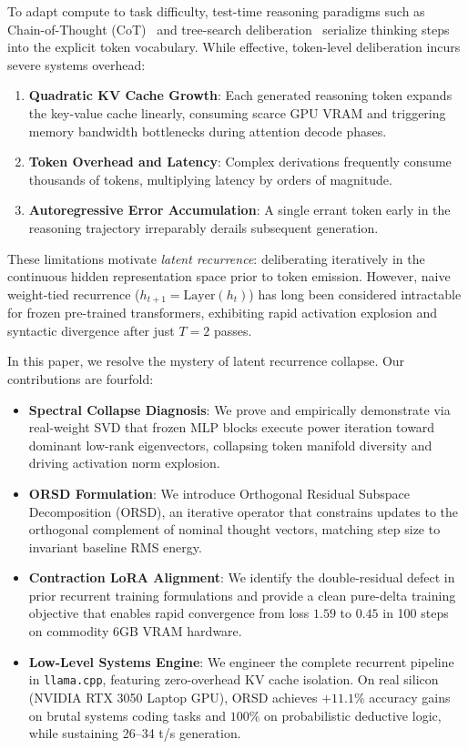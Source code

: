 \documentclass[11pt,a4paper]{article}
\theoremstyle{plain}
\theoremstyle{definition}
\theoremstyle{remark}
\begin{document}
To adapt compute to task difficulty, test-time reasoning paradigms such as Chain-of-Thought (CoT)~\cite{wei2022chain} and tree-search deliberation~\cite{yao2023tree} serialize thinking steps into the explicit token vocabulary. While effective, token-level deliberation incurs severe systems overhead:
\begin{enumerate}
    \item \textbf{Quadratic KV Cache Growth}: Each generated reasoning token expands the key-value cache linearly, consuming scarce GPU VRAM and triggering memory bandwidth bottlenecks during attention decode phases.
    \item \textbf{Token Overhead and Latency}: Complex derivations frequently consume thousands of tokens, multiplying latency by orders of magnitude.
    \item \textbf{Autoregressive Error Accumulation}: A single errant token early in the reasoning trajectory irreparably derails subsequent generation.
\end{enumerate}

These limitations motivate \textit{latent recurrence}: deliberating iteratively in the continuous hidden representation space prior to token emission. However, naive weight-tied recurrence ($h_{t+1} = \text{Layer}(h_t)$) has long been considered intractable for frozen pre-trained transformers, exhibiting rapid activation explosion and syntactic divergence after just $T=2$ passes.

In this paper, we resolve the mystery of latent recurrence collapse. Our contributions are fourfold:
\begin{itemize}
    \item \textbf{Spectral Collapse Diagnosis}: We prove and empirically demonstrate via real-weight SVD that frozen MLP blocks execute power iteration toward dominant low-rank eigenvectors, collapsing token manifold diversity and driving activation norm explosion.
    \item \textbf{ORSD Formulation}: We introduce Orthogonal Residual Subspace Decomposition (ORSD), an iterative operator that constrains updates to the orthogonal complement of nominal thought vectors, matching step size to invariant baseline RMS energy.
    \item \textbf{Contraction LoRA Alignment}: We identify the double-residual defect in prior recurrent training formulations and provide a clean pure-delta training objective that enables rapid convergence from loss $1.59$ to $0.45$ in 100 steps on commodity 6GB VRAM hardware.
    \item \textbf{Low-Level Systems Engine}: We engineer the complete recurrent pipeline in \texttt{llama.cpp}, featuring zero-overhead KV cache isolation. On real silicon (NVIDIA RTX 3050 Laptop GPU), ORSD achieves $+11.1\%$ accuracy gains on brutal systems coding tasks and $100\%$ on probabilistic deductive logic, while sustaining 26--34 t/s generation.
\end{itemize}
\end{document}
